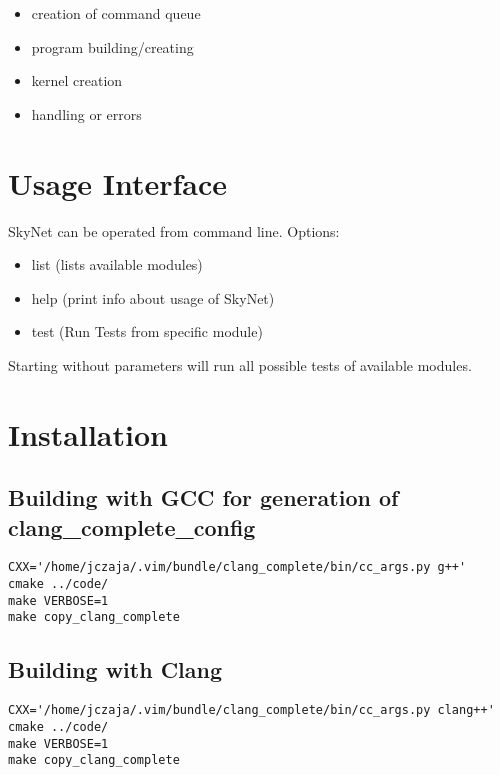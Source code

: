 \documentclass[a4paper,10pt]{article}
\begin{document}
\begin{itemize}
\item creation of command queue
\item program building/creating
\item kernel creation
\item handling or errors
\end{itemize}


\section{Usage Interface}
SkyNet can be operated from command line. Options:
\begin{itemize}
\item list (lists available modules)
\item help (print info about usage of SkyNet)
\item test (Run Tests from specific module)
\end{itemize}

Starting without parameters will run all possible tests of available modules.


\section{Installation}
\subsection{Building with GCC for generation of clang\_complete\_config}
\begin{verbatim}
CXX='/home/jczaja/.vim/bundle/clang_complete/bin/cc_args.py g++'   cmake ../code/
make VERBOSE=1
make copy_clang_complete
\end{verbatim}
\subsection{Building with Clang}
\begin{verbatim}
CXX='/home/jczaja/.vim/bundle/clang_complete/bin/cc_args.py clang++'   cmake ../code/
make VERBOSE=1
make copy_clang_complete
\end{verbatim}
\end{document}
